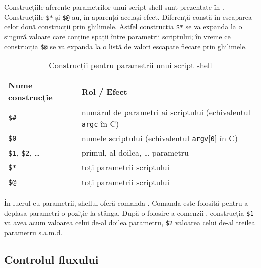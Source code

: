 Construcțiile aferente parametrilor unui script shell sunt prezentate în .
Construcțiile \texttt{\$*} și \texttt{\$@} au, în aparență același efect.
Diferență constă în escaparea celor două construcții prin ghilimele.
Astfel construcția \texttt{\$*} se va expanda la o singură valoare care conține spații între parametrii scriptului; în vreme ce construcția \texttt{\$@} se va expanda la o listă de valori escapate fiecare prin ghilimele.

\begin{table}[!htb]
  \caption{Construcții pentru parametrii unui script shell}
  \begin{center}
    \begin{tabular}{ p{} p{} }
      \toprule
        \textbf{Nume construcție} &
        \textbf{Rol / Efect} \\
      \midrule
        \texttt{\$\#} &
        numărul de parametri ai scriptului (echivalentul \texttt{argc} în C) \\

        \texttt{\$0} &
        numele scriptului (echivalentul \texttt{argv$[$0$]$} în C) \\

        \texttt{\$1}, \texttt{\$2}, \ldots &
        primul, al doilea, \ldots{} parametru\\

        \texttt{\$*} &
        toți parametrii scriptului\\

        \texttt{\$@} &
        toți parametrii scriptului \\

      \bottomrule
    \end{tabular}
    \label{tab:auto:script-params}
  \end{center}
\end{table}

În lucrul cu parametrii, shellul oferă comanda .
Comanda  este folosită pentru a deplasa parametri o poziție la stânga.
După o folosire a comenzii , construcția \texttt{\$1} va avea acum valoarea celui de-al doilea parametru, \texttt{\$2} valoarea celui de-al treilea parametru ș.a.m.d.

\subsection{Controlul fluxului}
\label{sec:auto:script-func:flow-control}

